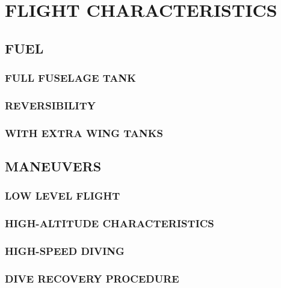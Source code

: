 \chapter{FLIGHT CHARACTERISTICS}
\minitoc{}
\cleardoublepage{}


\section{FUEL}
\subsection{FULL FUSELAGE TANK}
\subsection{REVERSIBILITY}
\subsection{WITH EXTRA WING TANKS}


\section{MANEUVERS}
\subsection{LOW LEVEL FLIGHT}
\subsection{HIGH-ALTITUDE CHARACTERISTICS}
\subsection{HIGH-SPEED DIVING}
\subsection{DIVE RECOVERY PROCEDURE}
